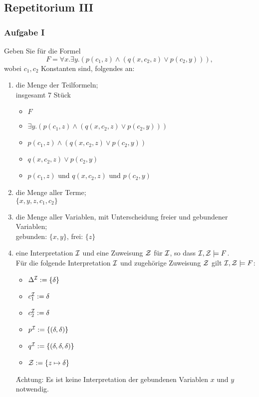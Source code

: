 \subsection*{Repetitorium III}
\subsubsection*{Aufgabe I}
    Geben Sie für die Formel
    \begin{equation*}
        F = \forall x.\exists y.(p(c_1,z) \land (q(x,c_2,z) \lor p(c_2,y))),
    \end{equation*}
    wobei $c_1,c_2$ Konstanten sind, folgendes an:
    \begin{enumerate}
        \item die Menge der Teilformeln; \\
        \LOES insgesamt 7 Stück
        \begin{itemize}
            \item $F$
            \item $\exists y.(p(c_1,z) \land (q(x, c_2, z) \lor p(c_2,y)))$
            \item $p(c_1,z) \land (q(x,c_2,z) \lor p(c_2, y))$
            \item $q(x,c_2,z) \lor p(c_2, y)$
            \item $p(c_1, z)$ und $q(x,c_2,z)$ und $p(c_2, y)$
        \end{itemize}

        \item die Menge aller Terme; \\
        \LOES $\{ x, y, z, c_1, c_2 \}$

        \item die Menge aller Variablen, mit Unterscheidung freier und gebundener Variablen; \\
        \LOES gebunden: $\{ x, y \}$, frei: $\{ z \}$

        \item eine Interpretation $\mathcal{I}$ und eine Zuweisung $\mathcal{Z}$ für $\mathcal{I}$, so dass $\mathcal{I},\mathcal{Z} \models F$. \\
        \LOES Für die folgende Interpretation $\mathcal{I}$ und zugehörige Zuweisung $\mathcal{Z}$ gilt $\mathcal{I}, \mathcal{Z} \models F$:
        \begin{itemize}
            \item $\Delta^{\mathcal{I}} := \{\delta \}$
            \item $c_1^{\mathcal{I}} := \delta$
            \item $c_2^{\mathcal{I}} := \delta$
            \item $p^{\mathcal{I}} := \{(\delta,\delta)\}$
            \item $q^{\mathcal{I}} := \{(\delta,\delta,\delta)\}$
            \item $\mathcal{Z} := \{ z \mapsto \delta \}$
        \end{itemize}
        \f{Achtung:} Es ist keine Interpretation der gebundenen Variablen $x$ und $y$ notwendig. \\


\end{enumerate}
